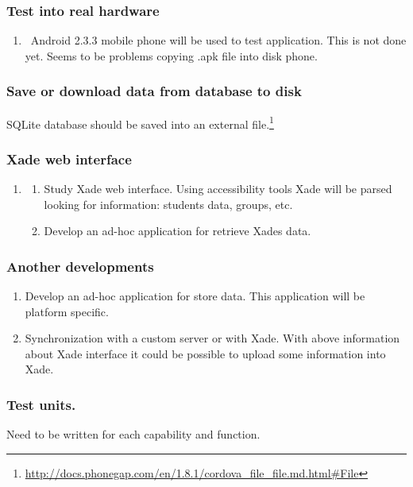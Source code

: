 \documentclass[a4paper]{article}
\begin{document}
\subsubsection[Test into real hardware]{Test into real hardware}
\hypertarget{RefHeading146561801272074}{}\begin{enumerate}
\item[] \ Android 2.3.3 mobile phone will be used to test application.
This is not done yet. Seems to be problems copying .apk file into disk
phone.
\end{enumerate}
\subsubsection[Save or download data from database to disk]{Save or
download data from database to disk}
\hypertarget{RefHeading146581801272074}{}SQLite database should be saved
into an external
file.\footnote{\url{http://docs.phonegap.com/en/1.8.1/cordova_file_file.md.html\#File}}

\subsubsection[Xade web interface]{Xade web interface}
\hypertarget{RefHeading146601801272074}{}\begin{enumerate}
\item \begin{enumerate}
\item Study Xade web interface. Using accessibility tools Xade will be
parsed looking for information: students data, groups, etc.
\item Develop an ad-hoc application for retrieve Xade{\textquotesingle}s
data. 
\end{enumerate}
\end{enumerate}
\subsubsection[Another developments]{Another developments}
\hypertarget{RefHeading146621801272074}{}\begin{enumerate}
\item Develop an ad-hoc application for store data. This application
will be platform specific.
\item Synchronization with a custom server or with Xade. With above
information about Xade interface it could be possible to upload some
information into Xade.
\end{enumerate}
\subsubsection[Test units. ]{Test units. }
\hypertarget{RefHeading146641801272074}{}Need to be written for each
capability and function.
\end{document}
